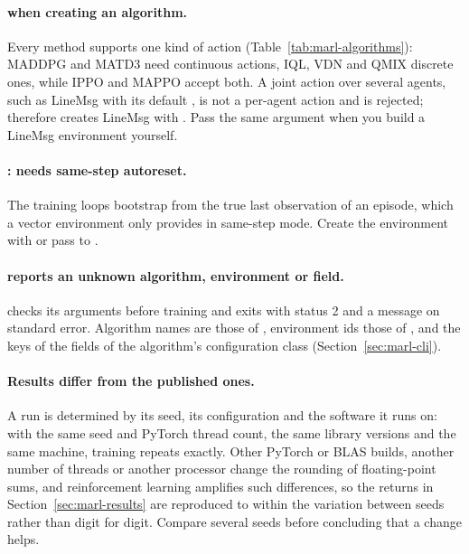 \paragraph{ when creating an algorithm.} Every method supports
one kind of action (Table~\ref{tab:marl-algorithms}): MADDPG and MATD3 need
continuous actions, IQL, VDN and QMIX discrete ones, while IPPO and MAPPO
accept both. A joint  action over several agents, such as
LineMsg with its default , is not a per-agent action
and is rejected;  therefore creates LineMsg with
. Pass the same argument when you build
a LineMsg environment yourself.

\paragraph{:  needs same-step autoreset.}
The training loops bootstrap from the true last observation of an episode,
which a vector environment only provides in same-step mode. Create the
environment with  or pass
 to .

\paragraph{ reports an unknown algorithm, environment or
field.}  checks its arguments before training and exits with
status 2 and a message on standard error. Algorithm names are those of
, environment ids those of , and the
keys of  the fields of the algorithm's configuration class
(Section~\ref{sec:marl-cli}).

\paragraph{Results differ from the published ones.} A run is determined by its
seed, its configuration and the software it runs on: with the same seed and
PyTorch thread count, the same library versions and the same machine,
training repeats exactly. Other PyTorch or BLAS builds, another number of
threads or another processor change the rounding of floating-point sums, and
reinforcement learning amplifies such differences, so the returns in
Section~\ref{sec:marl-results} are reproduced to within the variation between
seeds rather than digit for digit. Compare several seeds before concluding
that a change helps.

